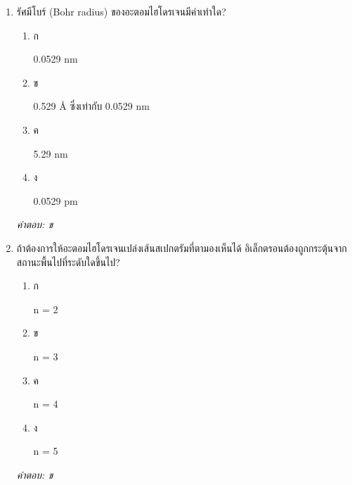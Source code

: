 \documentclass[12pt]{article}
\begin{document}
\begin{enumerate}[label=\arabic*., itemsep=0.5\baselineskip, topsep=0.5\baselineskip, leftmargin=*]
\item รัศมีโบร์ (Bohr radius) ของอะตอมไฮโดรเจนมีค่าเท่าใด?
\begin{enumerate}[label=\alph*)., itemsep=0.3\baselineskip, topsep=0.3\baselineskip]
\item ก\ 
\begin{minipage}[t]{0.9\linewidth}
\raggedright 0.0529 nm
\end{minipage}
\item ข\ 
\begin{minipage}[t]{0.9\linewidth}
\raggedright 0.529 Å ซึ่งเท่ากับ 0.0529 nm
\end{minipage}
\item ค\ 
\begin{minipage}[t]{0.9\linewidth}
\raggedright 5.29 nm
\end{minipage}
\item ง\ 
\begin{minipage}[t]{0.9\linewidth}
\raggedright 0.0529 pm
\end{minipage}
\end{enumerate}
\vspace{-0.3\baselineskip}
\begin{small}
\textit{คำตอบ: ข}
\end{small}

\item ถ้าต้องการให้อะตอมไฮโดรเจนเปล่งเส้นสเปกตรัมที่ตามองเห็นได้ อิเล็กตรอนต้องถูกกระตุ้นจากสถานะพื้นไปที่ระดับใดขึ้นไป?
\begin{enumerate}[label=\alph*)., itemsep=0.3\baselineskip, topsep=0.3\baselineskip]
\item ก\ 
\begin{minipage}[t]{0.9\linewidth}
\raggedright n = 2
\end{minipage}
\item ข\ 
\begin{minipage}[t]{0.9\linewidth}
\raggedright n = 3
\end{minipage}
\item ค\ 
\begin{minipage}[t]{0.9\linewidth}
\raggedright n = 4
\end{minipage}
\item ง\ 
\begin{minipage}[t]{0.9\linewidth}
\raggedright n = 5
\end{minipage}
\end{enumerate}
\vspace{-0.3\baselineskip}
\begin{small}
\textit{คำตอบ: ข}
\end{small}


\end{enumerate}
\end{document}
